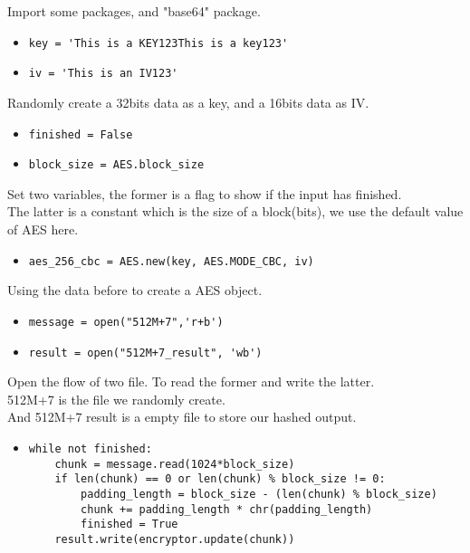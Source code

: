 \documentclass{article}
\begin{document}
\noindent Import some packages, and "base64" package.

\begin{itemize}
\item \verb|key = 'This is a KEY123This is a key123'|
\item \verb|iv = 'This is an IV123'|
\end{itemize}

\noindent Randomly create a 32bits data as a key, and a 16bits data as IV.

\begin{itemize}
\item \verb|finished = False|
\item \verb|block_size = AES.block_size|
\end{itemize}

\noindent Set two variables, the former is a flag to show if the input has finished.\\
The latter is a constant which is the size of a block(bits), we use the default value of AES here.

\begin{itemize}
\item \verb|aes_256_cbc = AES.new(key, AES.MODE_CBC, iv)|
\end{itemize}

\noindent Using the data before to create a AES object.

\begin{itemize}
\item \verb|message = open("512M+7",'r+b')|
\item \verb|result = open("512M+7_result", 'wb')|
\end{itemize}
 
\noindent Open the flow of two file. To read the former and write the latter.\\
512M+7 is the file we randomly create.\\
And 512M+7 result is a empty file to store our hashed output.

\begin{itemize}
\item \begin{verbatim}while not finished:
    chunk = message.read(1024*block_size)
    if len(chunk) == 0 or len(chunk) % block_size != 0:
        padding_length = block_size - (len(chunk) % block_size)
        chunk += padding_length * chr(padding_length)
        finished = True
    result.write(encryptor.update(chunk))
\end{verbatim}
\end{itemize}
\end{document}
